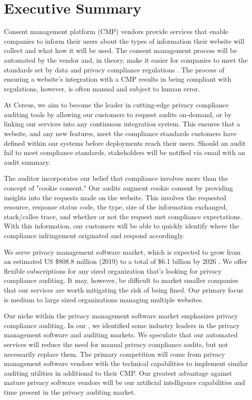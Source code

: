 {\let\cleardoublepage\relax \chapter*{Executive Summary}}

Consent management platform (CMP) vendors provide services that enable companies to inform their users about the types of information their website will collect and what how it will be used. The consent management process will be automated by the vendor and, in theory, make it easier for companies to meet the standards set by data and privacy compliance regulations \cite{cmp.what.2020}. The process of ensuring a website's integration with a CMP results in being compliant with regulations, however, is often manual and subject to human error.

At Cereus, we aim to become the leader in cutting-edge privacy compliance auditing tools by allowing our customers to request audits on-demand, or by linking our services into any continuous integration system. This ensures that a website, and any new features, meet the compliance standards customers have defined within our systems before deployments reach their users. Should an audit fail to meet compliance standards, stakeholders will be notified via email with an audit summary.

The auditor incorporates our belief that compliance involves more than the concept of "cookie consent." Our audits augment cookie consent by providing insights into the requests made on the website. This involves the requested resource, response status code, the type, size of the information exchanged, stack/callee trace, and whether or not the request met compliance expectations. With this information, our customers will be able to quickly identify where the compliance infringement originated and respond accordingly.

We serve privacy management software market, which is expected to grow from an estimated US \$808.8 million (2019) to a total of \$6.1 billion by 2026 \cite{qy.2020}. We offer flexible subscriptions for any sized organization that's looking for privacy compliance auditing. It may, however, be difficult to market smaller companies that our services are worth mitigating the risk of being fined. Our primary focus is medium to large sized organizations managing multiple websites. 

Our niche within the privacy management software market emphasizes privacy compliance auditing. In our , we identified some industry leaders in the privacy management software and auditing markets. We speculate that our automated services will reduce the need for manual privacy compliance audits, but not necessarily replace them. The primary competition will come from privacy management software vendors with the technical capabilities to implement similar auditing utilities in additional to their CMP. Our greatest advantage against mature privacy software vendors will be our artificial intelligence capabilities and time present in the privacy auditing market.

